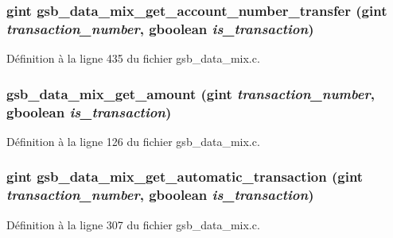 \subsubsection[{gsb\_\-data\_\-mix\_\-get\_\-account\_\-number\_\-transfer}]{\setlength{\rightskip}{0pt plus 5cm}gint gsb\_\-data\_\-mix\_\-get\_\-account\_\-number\_\-transfer (gint {\em transaction\_\-number}, \/  gboolean {\em is\_\-transaction})}\label{gsb__data__mix_8c_ae37f747ccb8cc786b5354c5b64f6babe}


Définition à la ligne 435 du fichier gsb\_\-data\_\-mix.c.

\subsubsection[{gsb\_\-data\_\-mix\_\-get\_\-amount}]{ gsb\_\-data\_\-mix\_\-get\_\-amount (gint {\em transaction\_\-number}, \/  gboolean {\em is\_\-transaction})}\label{gsb__data__mix_8c_aa963e3136d650325f75c04f6f1de62bd}


Définition à la ligne 126 du fichier gsb\_\-data\_\-mix.c.

\subsubsection[{gsb\_\-data\_\-mix\_\-get\_\-automatic\_\-transaction}]{\setlength{\rightskip}{0pt plus 5cm}gint gsb\_\-data\_\-mix\_\-get\_\-automatic\_\-transaction (gint {\em transaction\_\-number}, \/  gboolean {\em is\_\-transaction})}\label{gsb__data__mix_8c_a985bfc0d8565c8ebd4977e4f9b1fae48}


Définition à la ligne 307 du fichier gsb\_\-data\_\-mix.c.

